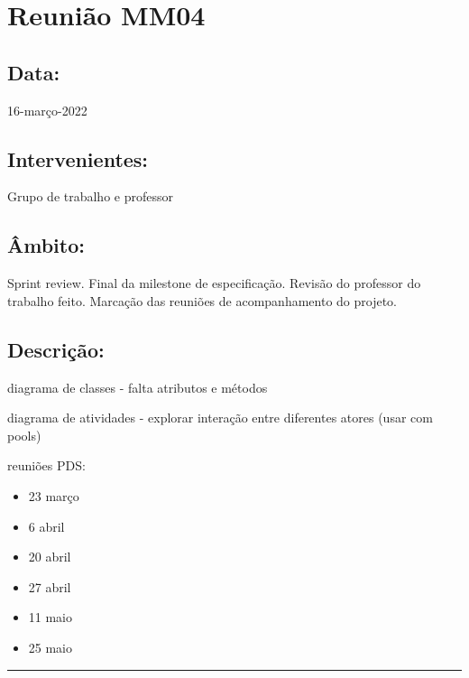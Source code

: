 \section{Reunião MM04}\label{reuniaoMM04}

\subsection*{Data:}
16-março-2022

\subsection*{Intervenientes:}
Grupo de trabalho e professor

\subsection*{Âmbito:}
Sprint review.
Final da milestone de especificação.
Revisão do professor do trabalho feito.
Marcação das reuniões de acompanhamento do projeto.

\subsection*{Descrição:}

diagrama de classes - falta atributos e métodos

diagrama de atividades - explorar interação entre diferentes atores (usar com pools)

reuniões PDS:
\begin{itemize}
	\item23 março
	\item6 abril
	\item20 abril
	\item27 abril
	\item11 maio
	\item25 maio
\end{itemize}

\noindent \rule{\linewidth}{0.4pt}
\newline

